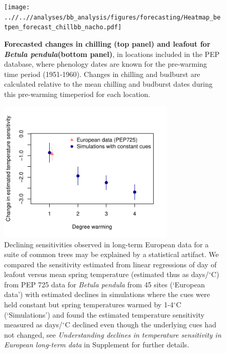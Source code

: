 \documentclass{article}
\begin{document}
\begin{figure}[h!]
\centering
\noindent \texttt{[image: ..//..//analyses/bb\_analysis/figures/forecasting/Heatmap\_betpen\_forecast\_chillbb\_nacho.pdf]}
\caption{\textbf{Forecasted changes in chilling (top panel) and leafout for \emph{Betula pendula}(bottom panel)}, in locations included in the PEP database, where phenology dates are known for the pre-warming time period (1951-1960). Changes in chilling and budburst are calculated relative to the mean chilling and budburst dates during this pre-warming timeperiod for each location.} 
\label{fig:foremap}
\end{figure}

\newpage
\begin{figure}[h!]
\centering
\noindent \includegraphics[width=0.75\textwidth]{..//..//analyses/bb_analysis/PEP_climate/figures/peprealandsims.pdf}
\caption{Declining sensitivities observed in long-term European data for a suite of common trees may be explained by a statistical artifact. We compared the sensitivity estimated from linear regressions of day of leafout versus mean spring temperature (estimated thus as days/$^{\circ}$C) from PEP 725 data for \emph{Betula pendula} from 45 sites (`European data') with estimated declines in simulations where the cues were held constant but spring temperatures warmed by 1-4$^{\circ}$C (`Simulations') and found the estimated temperature sensitivity measured as days/$^{\circ}$C declined even though the underlying cues had not changed, see \emph{Understanding declines in temperature sensitivity in European long-term data} in Supplement for further details.}
\label{fig:pepsims}
\end{figure}
\end{document}
